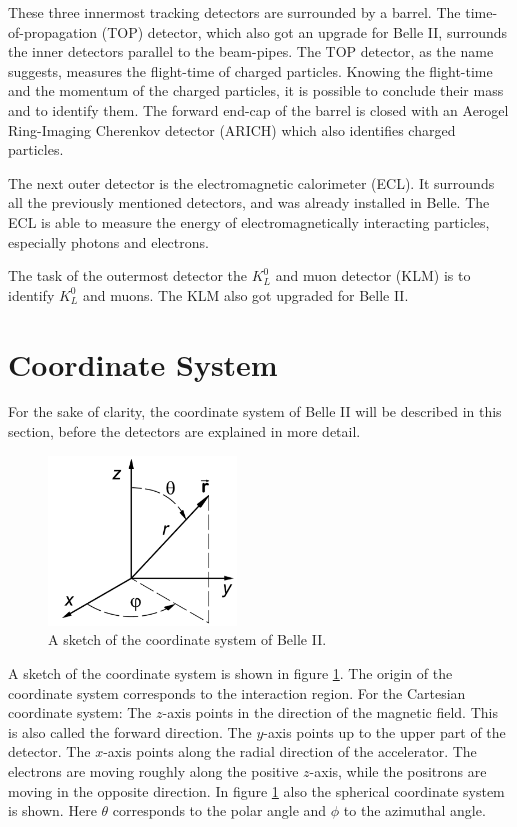 \documentclass[a4paper,11pt,twosided,final,german,openbib,pdftex,listof=totoc,bibliography=totoc]{scrbook}
\begin{document}
These three innermost tracking detectors are surrounded by a barrel. The time-of-propagation (TOP) detector, which also got an upgrade for Belle II, surrounds the inner detectors parallel to the beam-pipes. The TOP detector, as the name suggests, measures the flight-time of charged particles. Knowing the flight-time and the momentum of the charged particles, it is possible to conclude their mass and to identify them. The forward end-cap of the barrel is closed with an Aerogel Ring-Imaging Cherenkov detector (ARICH) which also identifies charged particles.

The next outer detector is the electromagnetic calorimeter (ECL). It surrounds all the previously mentioned detectors, and was already installed in Belle. The ECL is able to measure the energy of electromagnetically interacting particles, especially photons and electrons.

The task of the outermost detector the $K_L^0$ and muon detector (KLM) is to identify $K_L^0$ and muons. The KLM also got upgraded for Belle II. \cite{B2B} 

\section{Coordinate System}

For the sake of clarity, the coordinate system of Belle II will be described in this section, before the detectors are explained in more detail.

\begin{figure}[h!]
	\begin{center}
		\includegraphics[width=5cm]{Bilder/coordinate.png}
	\end{center}
	\caption[Coordinate System Of Belle II]{A sketch of the coordinate system of Belle II. \cite{wiki:xxx}}
	\label{fig:CoordinateSysytem}
\end{figure}

A sketch of the coordinate system is shown in figure \ref{fig:CoordinateSysytem}. The origin of the coordinate system corresponds to the interaction region. For the Cartesian coordinate system: The $z$-axis points in the direction of the magnetic field. This is also called the forward direction. The $y$-axis points up to the upper part of the detector. The $x$-axis points along the radial direction of the accelerator. The electrons are moving roughly along the positive $z$-axis, while the positrons are moving in the opposite direction. In figure \ref{fig:CoordinateSysytem} also the spherical coordinate system is shown. Here $\theta$ corresponds to the polar angle and $\phi$ to the azimuthal angle.\cite{DevelopVertex}
\end{document}
